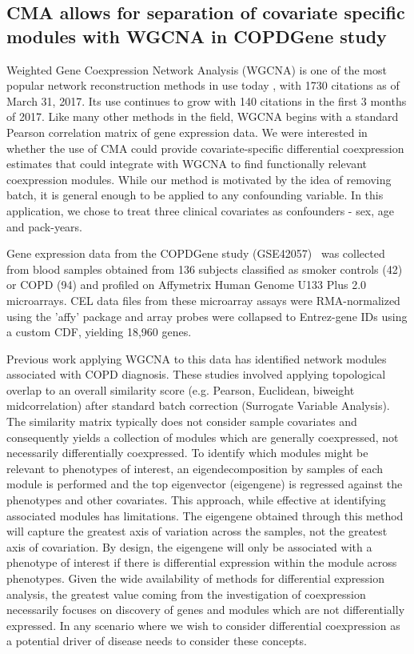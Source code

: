 \subsection{CMA allows for separation of covariate specific modules with
WGCNA in COPDGene study}

Weighted Gene Coexpression Network Analysis (WGCNA) is one of the
most popular network reconstruction methods in use today \cite{wgcna1},
with 1730 citations as of March 31, 2017. Its use continues to grow
with 140 citations in the first 3 months of 2017. Like many other
methods in the field, WGCNA begins with a standard Pearson correlation
matrix of gene expression data. We were interested in whether the
use of CMA could provide covariate-specific differential coexpression
estimates that could integrate with WGCNA to find functionally relevant
coexpression modules. While our method is motivated by the idea of
removing batch, it is general enough to be applied to any confounding
variable. In this application, we chose to treat three clinical covariates as confounders - sex, age and pack-years. 

Gene expression data from the COPDGene study (GSE42057)~\cite{bahr2013peripheral,regan2011genetic}
was collected from blood samples obtained from 136 subjects classified as smoker controls (42) or COPD (94) and profiled on  Affymetrix Human Genome U133 Plus 2.0  microarrays. CEL data files from these microarray assays were RMA-normalized using the 'affy' package and array probes were collapsed to Entrez-gene IDs using a custom CDF\cite{dai2005evolving}, yielding 18,960 genes.

Previous work applying WGCNA to this data has identified network modules
associated with COPD diagnosis\cite{morrow2015identifying,morrow2017functional}.
These studies involved applying topological overlap to an overall
similarity score (e.g. Pearson, Euclidean, biweight midcorrelation)
after standard batch correction (Surrogate Variable Analysis\cite{leek2007capturing}).
The similarity matrix typically does not consider sample covariates
and consequently yields a collection of modules which are generally
coexpressed, not necessarily differentially coexpressed. To identify
which modules might be relevant to phenotypes of interest, an eigendecomposition
by samples of each module is performed and the top eigenvector (eigengene)
is regressed against the phenotypes and other covariates. This approach,
while effective at identifying associated modules has limitations.
The eigengene obtained through this method will capture the greatest
axis of variation across the samples, not the greatest axis of covariation.
By design, the eigengene will only be associated with a phenotype
of interest if there is differential expression within the module
across phenotypes. Given the wide availability of methods for differential
expression analysis, the greatest value coming from the investigation
of coexpression necessarily focuses on discovery of genes and modules
which are not differentially expressed. In any scenario where we wish
to consider differential coexpression as a potential driver of disease
needs to consider these concepts.

